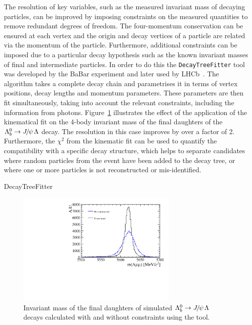 The resolution of key variables, such as the measured invariant mass of decaying particles,
can be improved by imposing constraints on the measured quantities to remove redundant degrees of freedom.
The four-momentum conservation can be ensured at each vertex and the origin and decay vertices of a particle 
are related via the momentum of the particle. Furthermore, additional constraints can be imposed due to a particular
decay hypothesis such as the known invariant masses of final and intermediate particles.
In order to do this the \verb!DecayTreeFitter! tool was developed by the BaBar experiment and later used by LHCb~\cite{Hulsbergen:2005pu}. 
The algorithm takes a complete decay chain and  parametrises it in terms of vertex positions, decay lengths and momentum parameters.
These parameters are then fit simultaneously, taking into account the relevant constraints, including the information
from photons. %
Figure~\ref{fig:DTFeffect} illustrates the effect of
the application of the kinematical fit on the 4-body invariant mass of the final daughters of the $\Lb\to\jpsi\Lz$ decay.
The resolution in this case improves by over a factor of 2. Furthermore, the $\chi^2$ from the kinematic fit
can be used to quantify the compatibility with a specific decay structure, which helps to separate candidates where random particles
from the event have been added to the decay tree, or where one or more particles is not reconstructed or mis-identified.
%
\begin{verbbox}DecayTreeFitter \end{verbbox}
\begin{figure}[h!]
\centering 
\includegraphics[width=0.7\textwidth]{Detector/figs/DTF_performance.pdf}
\caption{Invariant mass of the final daughters of simulated $\Lb\to\jpsi\Lz$ decays calculated
with and without constraints using the \theverbbox  tool. }
\label{fig:DTFeffect}
\end{figure}

